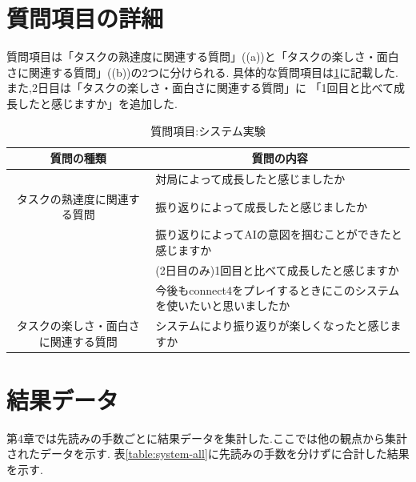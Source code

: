 \section{質問項目の詳細}
質問項目は「タスクの熟達度に関連する質問」((a))と「タスクの楽しさ・面白さに関連する質問」((b))の2つに分けられる.
具体的な質問項目は\ref{table:query}に記載した.また,2日目は「タスクの楽しさ・面白さに関連する質問」に
「1回目と比べて成長したと感じますか」を追加した.
\begin{table}[H]
    \caption{質問項目:システム実験}
    \label{table:query}
    \centering
	\scriptsize
    \begin{tabular}{c||l}
        \multicolumn{1}{c|}{質問の種類} & \multicolumn{1}{c}{質問の内容} \\ \hline \hline
        \multicolumn{1}{c||}{}&対局によって成長したと感じましたか \\
        タスクの熟達度に関連する質問 & 振り返りによって成長したと感じましたか \\
		\multicolumn{1}{c||}{}&振り返りによってAIの意図を掴むことができたと感じますか \\
		\multicolumn{1}{c||}{} & (2日目のみ)1回目と比べて成長したと感じますか\\\hline
        \multicolumn{1}{c||}{} & 今後もconnect4をプレイするときにこのシステムを使いたいと思いましたか \\
        タスクの楽しさ・面白さに関連する質問 & システムにより振り返りが楽しくなったと感じますか\\
    \end{tabular}
    
\end{table}
\section{結果データ}
第4章では先読みの手数ごとに結果データを集計した.ここでは他の観点から集計されたデータを示す.
表\ref{table:system-all}に先読みの手数を分けずに合計した結果を示す.
\begin{table}[H]
    \caption{結果:総合}
    \label{table:system-all}
    \scriptsize
    \centering
    
\end{table}


